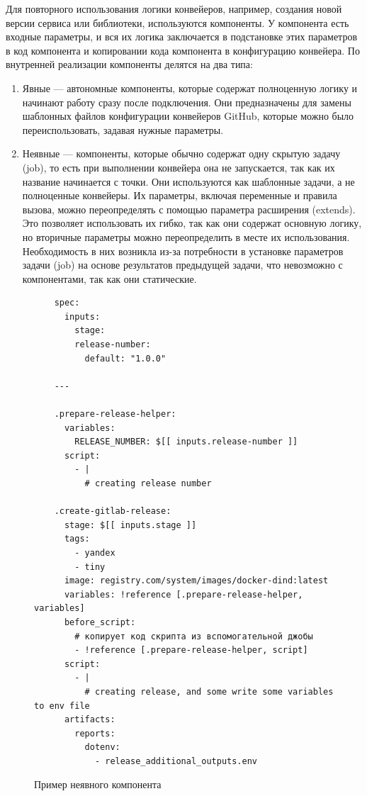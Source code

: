 Для повторного использования логики конвейеров, например, создания новой версии сервиса или библиотеки, используются компоненты.
У компонента есть входные параметры, и вся их логика заключается в подстановке этих параметров в код компонента и копировании кода компонента в конфигурацию конвейера.
По внутренней реализации компоненты делятся на два типа:
\begin{enumerate}
  \item Явные — автономные компоненты, которые содержат полноценную логику и начинают работу сразу после подключения.
  Они предназначены для замены шаблонных файлов конфигурации конвейеров GitHub, которые можно было переиспользовать, задавая нужные параметры.
  \item Неявные — компоненты, которые обычно содержат одну скрытую задачу (job), то есть при выполнении конвейера она не запускается, так как их название начинается с точки.
  Они используются как шаблонные задачи, а не полноценные конвейеры.
  Их параметры, включая переменные и правила вызова, можно переопределять с помощью параметра расширения (extends).
  Это позволяет использовать их гибко, так как они содержат основную логику, но вторичные параметры можно переопределить в месте их использования.
  Необходимость в них возникла из-за потребности в установке параметров задачи (job) на основе результатов предыдущей задачи, что невозможно с компонентами, так как они статические.
\end{enumerate}

\begin{figure}
  \centering
  \scriptsize
  \begin{verbatim}
    spec:
      inputs:
        stage:
        release-number:
          default: "1.0.0"

    ---

    .prepare-release-helper:
      variables:
        RELEASE_NUMBER: $[[ inputs.release-number ]]
      script:
        - |
          # creating release number

    .create-gitlab-release:
      stage: $[[ inputs.stage ]]
      tags:
        - yandex
        - tiny
      image: registry.com/system/images/docker-dind:latest
      variables: !reference [.prepare-release-helper, variables]
      before_script:
        # копирует код скрипта из вспомогательной джобы
        - !reference [.prepare-release-helper, script]
      script:
        - |
          # creating release, and some write some variables to env file
      artifacts:
        reports:
          dotenv:
            - release_additional_outputs.env
  \end{verbatim}
  \caption{Пример неявного компонента}
  \label{fig:implicit-component-code}
\end{figure}

